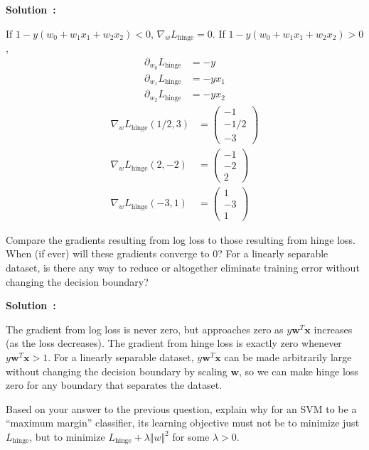 \documentclass{article}
\newcounter{problem}[section]
\newenvironment{solution}[1][]
    {\par\medskip \begin{mdframed}\textbf{Solution~\Alph{problem}#1:} \begin{em}}
    {\end{em}\medskip\end{mdframed}\medskip}
\begin{document}
\begin{solution}
  If $1 - y(w_0 + w_1 x_1 + w_2 x_2) < 0$, $\nabla_w L_\text{hinge} = 0$.
  If $1 - y(w_0 + w_1 x_1 + w_2 x_2) > 0$,
  \begin{align*}
    \partial_{w_0} L_\text{hinge} &= -y \\
    \partial_{w_1} L_\text{hinge} &= -y x_1 \\
    \partial_{w_2} L_\text{hinge} &= -y x_2
  \end{align*}
  \begin{align*}
    \nabla_w L_\text{hinge} (1/2, 3) &= \begin{pmatrix} -1 \\ -1/2 \\ -3 \end{pmatrix} \\
    \nabla_w L_\text{hinge} (2, -2)  &= \begin{pmatrix} -1 \\ -2 \\ 2 \end{pmatrix} \\
    \nabla_w L_\text{hinge} (-3, 1)  &= \begin{pmatrix} 1 \\ -3 \\ 1 \end{pmatrix}
  \end{align*}
\end{solution}

\problem[4]
Compare the gradients resulting from log loss to those resulting from hinge loss. When (if ever) will these gradients converge to 0? For a linearly separable dataset, is there any way to reduce or altogether eliminate training error without changing the decision boundary?

\begin{solution}
  The gradient from log loss is never zero, but approaches zero as $y \mathbf{w}^T \mathbf{x}$ increases (as the loss decreases).
  The gradient from hinge loss is exactly zero whenever $y \mathbf{w}^T \mathbf{x} > 1$.
  For a linearly separable dataset, $y \mathbf{w}^T \mathbf{x}$ can be made arbitrarily large without changing the decision boundary by scaling $\mathbf{w}$, so we can make hinge loss zero for any boundary that separates the dataset.
\end{solution}

\problem[5]
Based on your answer to the previous question, explain why for an SVM to be a ``maximum margin'' classifier, its learning objective must not be to minimize just $L_\text{hinge}$, but to minimize $L_\text{hinge} + \lambda\Vert w \Vert^2$ for some $\lambda > 0$.
\end{document}
